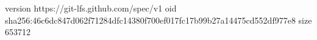 version https://git-lfs.github.com/spec/v1
oid sha256:46c6dc847d062f71284dfc14380f700ef017fc17b99b27a14475cd552df977e8
size 653712
